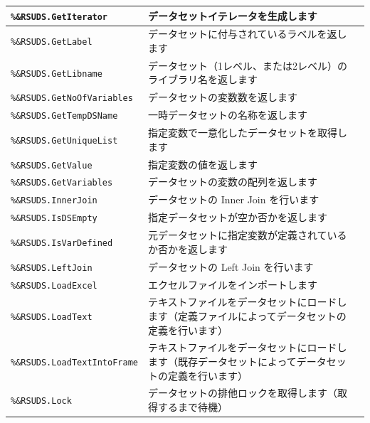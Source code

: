 \begin{center}
{\begin{xltabular}{\textwidth}{|p{4truecm}|X|p{1.2truecm}|}
\hline
\texttt{\%\&RSUDS.GetIterator}&データセットイテレータを生成します&\\
\hline
\texttt{\%\&RSUDS.GetLabel}&データセットに付与されているラベルを返します&\\
\hline
\texttt{\%\&RSUDS.GetLibname}&データセット（1レベル、または2レベル）のライブラリ名を返します&\\
\hline
\texttt{\%\&RSUDS.GetNoOfVariables}&データセットの変数数を返します&\\
\hline
\texttt{\%\&RSUDS.GetTempDSName}&一時データセットの名称を返します&\\
\hline
\texttt{\%\&RSUDS.GetUniqueList}&指定変数で一意化したデータセットを取得します&\\
\hline
\texttt{\%\&RSUDS.GetValue}&指定変数の値を返します&\\
\hline
\texttt{\%\&RSUDS.GetVariables}&データセットの変数の配列を返します&\\
\hline
\texttt{\%\&RSUDS.InnerJoin}&データセットの Inner Join を行います&\\
\hline
\texttt{\%\&RSUDS.IsDSEmpty}&指定データセットが空か否かを返します&\\
\hline
\texttt{\%\&RSUDS.IsVarDefined}&元データセットに指定変数が定義されているか否かを返します&\\
\hline
\texttt{\%\&RSUDS.LeftJoin}&データセットの Left Join を行います&\\
\hline
\texttt{\%\&RSUDS.LoadExcel}&エクセルファイルをインポートします&\\
\hline
\texttt{\%\&RSUDS.LoadText}&テキストファイルをデータセットにロードします（定義ファイルによってデータセットの定義を行います）&\\
\hline
\texttt{\%\&RSUDS.LoadTextIntoFrame}&テキストファイルをデータセットにロードします（既存データセットによってデータセットの定義を行います）&\\
\hline
\texttt{\%\&RSUDS.Lock}&データセットの排他ロックを取得します（取得するまで待機）&\\

\end{xltabular}}
\end{center}

